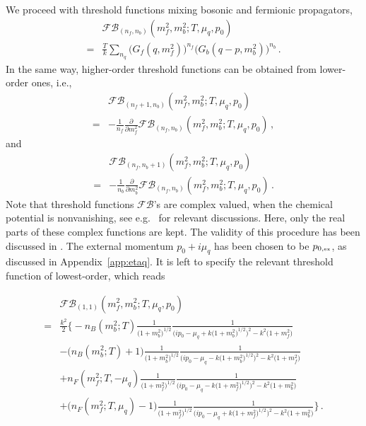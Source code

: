 \documentclass[%
reprint,
superscriptaddress,
showpacs,preprintnumbers,
 amsmath,amssymb,
 aps,
prd,
]{revtex4-1}
\def\app#1{Appendix~\ref{#1}}
\begin{document}
We proceed with threshold functions mixing bosonic and fermionic
propagators,
%
\begin{align}
  &\mathcal{FB}_{(n_f,n_b)}(m_f^2,m_b^2;T,\mu_q,p_0)
    \nonumber \\[1ex]\nonumber 
  =&\frac{T}{k}\sum_{n_q}\Big(G_{f}(q,m_f^2)\Big)^{n_f}
     \Big(G_{b}(q-p,m_b^2)\Big)^{n_b}\,.
\end{align}
%
In the same way, higher-order threshold functions can be obtained from
lower-order ones, i.e.,
%
\begin{align}
  &\mathcal{FB}_{(n_f+1,n_b)}(m_f^2,m_b^2;T,\mu_q,p_0)
    \nonumber\\[1ex]
  =&-\frac{1}{n_f}\frac{\partial}{\partial m_f^2}
     \mathcal{FB}_{(n_f,n_b)}(m_f^2,m_b^2;T,\mu_q,p_0)\,,
\end{align}
%
and 
%
\begin{align}
  &\mathcal{FB}_{(n_f,n_b+1)}(m_f^2,m_b^2;T,\mu_q,p_0)
    \nonumber\\[1ex]
  =&-\frac{1}{n_b}\frac{\partial}{\partial m_b^2}
     \mathcal{FB}_{(n_f,n_b)}(m_f^2,m_b^2;T,\mu_q,p_0)\,.
\end{align}
%
Note that threshold functions $\mathcal{FB}$'s are complex valued,
when the chemical potential is nonvanishing, see e.g.\
\cite{Fu:2015naa, Fu:2016tey} for relevant discussions. Here, only the
real parts of these complex functions are kept. The validity of this
procedure has been discussed in \cite{Pawlowski:2014zaa,
  Fu:2016tey}. The external momentum $p_0+i\mu_q $ has been chosen to
be $p_{0,\text{\tiny{ex}}}$, as discussed in \app{app:etaq}. It is
left to specify the relevant threshold function of lowest-order, which
reads
%
\begin{widetext}
\begin{align}
  &\mathcal{FB}_{(1,1)}(m_f^2,m_b^2;T,\mu_q,p_0)\nonumber \\[1ex]
  =&\frac{k^2}{2}\bigg\{-n_{B}(m_b^2;T)\frac{1}{\big(1+m_b^2\big)^{1/2}}
     \frac{1}{\Big(ip_0-\mu_q+k\big(1+m_b^2\big)^{1/2}\Big)^2-k^2
     \big(1+m_f^2\big)}\nonumber \\[1ex]
  &-\big(n_{B}(m_b^2;T)+1\big)\frac{1}{\big(1+m_b^2\big)^{1/2}}
    \frac{1}{\Big(ip_0-\mu_q-k\big(1+m_b^2\big)^{1/2}\Big)^2-k^2
    \big(1+m_f^2\big)}\nonumber\\[1ex]
  &+n_{F}(m_f^2;T,-\mu_q)\frac{1}{\big(1+m_f^2\big)^{1/2}}
    \frac{1}{\Big(ip_0-\mu_q-k\big(1+m_f^2\big)^{1/2}\Big)^2
    -k^2\big(1+m_b^2\big)}\nonumber\\[1ex]
  &+\big(n_{F}(m_f^2;T,\mu_q)-1\big)\frac{1}{\big(1+m_f^2
    \big)^{1/2}}\frac{1}{\Big(ip_0-\mu_q+k\big(1+m_f^2\big)^{1/2}
    \Big)^2-k^2\big(1+m_b^2\big)}\bigg\}\,.
\label{eq:f1b1}
\end{align}
\end{widetext}
\end{document}

